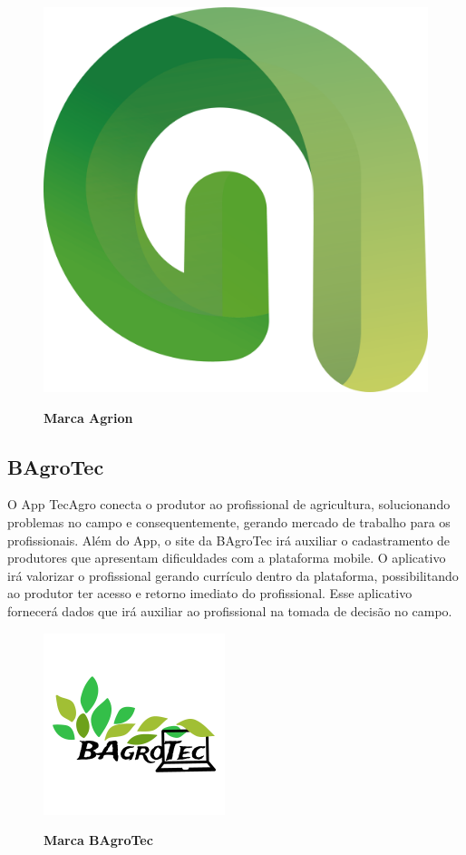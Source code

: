 \begin{figure}[H]
\centering
\caption{\textbf{Marca Agrion}}
\includegraphics[scale=0.3]{Imagens/agrion.png}
\label{figura_14}
\end{figure}

\subsection{BAgroTec}

O App TecAgro conecta o produtor ao profissional de agricultura, solucionando problemas no campo e consequentemente, gerando mercado de trabalho para os profissionais. Além do App, o site da BAgroTec irá auxiliar o cadastramento de produtores que apresentam dificuldades com a plataforma mobile. O aplicativo irá valorizar o profissional gerando currículo dentro da plataforma, possibilitando ao produtor ter acesso e retorno imediato do profissional. Esse aplicativo fornecerá dados que irá auxiliar ao profissional na tomada de decisão no campo.

\begin{figure}[H]
\centering
\caption{\textbf{Marca BAgroTec}}
\includegraphics[scale=1.5]{Imagens/bagrotec.png}
\label{figura_15}
\end{figure}


